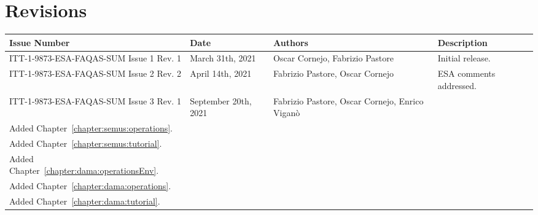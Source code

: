 
\section*{Revisions}
\label{sec:revisions}

\setlength\LTleft{0pt}
\setlength\LTright{0pt}
\scriptsize 
\begin{longtable}{|p{2cm}|p{2cm}|p{2cm}|p{7cm}|@{}}
\label{table:codeoperators} \\
\hline
\textbf{Issue Number}&\textbf{Date}&\textbf{Authors}&\textbf{Description}\\
\hline
ITT-1-9873-ESA-FAQAS-SUM
Issue 1 Rev. 1&
March 31th, 2021&
Oscar Cornejo, Fabrizio Pastore&
\begin{minipage}{8cm}
Initial release.
\end{minipage}
\\
\hline
ITT-1-9873-ESA-FAQAS-SUM
Issue 2 Rev. 2&
April 14th, 2021&
Fabrizio Pastore, Oscar Cornejo&
\begin{minipage}{8cm}
ESA comments addressed.
\end{minipage}
\\
\hline
ITT-1-9873-ESA-FAQAS-SUM
Issue 3 Rev. 1&
September 20th, 2021&
Fabrizio Pastore, Oscar Cornejo, Enrico Viganò&
\begin{minipage}{8cm}
Added Chapter~\ref{chapter:semus:operationsEnv}.\\
Added Chapter~\ref{chapter:semus:operations}.\\
Added Chapter~\ref{chapter:semus:tutorial}.\\
Added Chapter~\ref{chapter:dama:operationsEnv}.\\
Added Chapter~\ref{chapter:dama:operations}.\\
Added Chapter~\ref{chapter:dama:tutorial}.
\end{minipage}
\\
\hline



                                                    
\end{longtable}
\normalsize

\clearpage